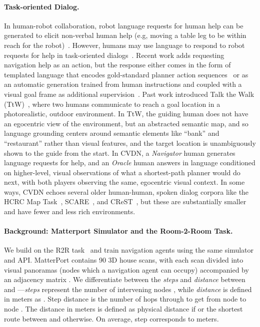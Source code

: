 \documentclass{article}
\newcommand{\dataset}{CVDN}
\newcommand{\nav}{\textit{Navigator}}
\newcommand{\ora}{\textit{Oracle}}
\begin{document}
\paragraph{Task-oriented Dialog.}
In human-robot collaboration, robot language requests for human help can be generated to elicit non-verbal human help (e.g, moving a table leg to be within reach for the robot)~\cite{tellex:rss14}.
However, humans may use language to respond to robot requests for help in task-oriented dialogs~\cite{thomason:icra19,williams:auro19,marge:naacl19}.
Recent work adds requesting navigation help as an action, but the response either comes in the form of templated language that encodes gold-standard planner action sequences~\cite{nguyen:cvpr19} or as an automatic generation trained from human instructions and coupled with a visual goal frame as additional supervision~\cite{nguyen:emnlp19}.
Past work introduced Talk the Walk (TtW)~\cite{devries:arxiv18}, where two humans communicate to reach a goal location in a photorealistic, outdoor environment.
In TtW, the guiding human does not have an egocentric view of the environment, but an abstracted semantic map, and so language grounding centers around semantic elements like ``bank'' and ``restaurant'' rather than visual features, and the target location is unambiguously shown to the guide from the start.
In \dataset{}, a \nav{} human generates language requests for help, and an \ora{} human answers in language conditioned on higher-level, visual observations of what a shortest-path planner would do next, with both players observing the same, egocentric visual context.
In some ways, \dataset{} echoes several older human-human, spoken dialog corpora like the HCRC Map Task~\cite{anderson:ls91}, SCARE~\cite{stoia:lrec08}, and CReST~\cite{eberhard:lrec10}, but these are substantially smaller and have fewer and less rich environments.

\paragraph{Background: Matterport Simulator and the Room-2-Room Task.}
We build on the R2R task~\cite{anderson:cvpr18} and train navigation agents using the same simulator and API.
MatterPort contains 90 3D house scans, with each scan  divided into visual panoramas  (nodes which a navigation agent can occupy) accompanied by an adjacency matrix .
We differentiate between the \textit{steps} and \textit{distance} between  and ---\textit{steps} represent the number of intervening nodes , while \textit{distance} is defined in meters as .
Step distance  is the number of hops through  to get from node  to node .
The distance in meters  is defined as physical distance if  or the shortest route between  and  otherwise.
On average,  step corresponds to  meters.
\end{document}

